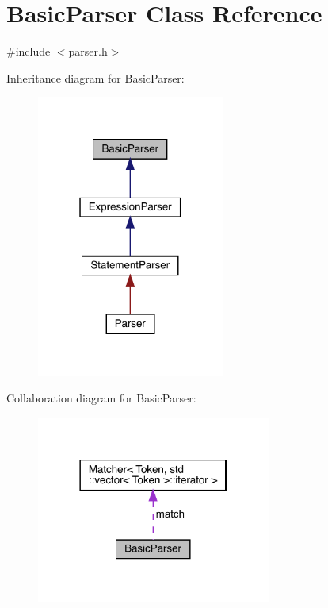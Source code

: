 \hypertarget{class_basic_parser}{}\section{Basic\+Parser Class Reference}
\label{class_basic_parser}


{\ttfamily \#include $<$parser.\+h$>$}



Inheritance diagram for Basic\+Parser\+:\nopagebreak
\begin{figure}[H]
\begin{center}
\leavevmode
\includegraphics[width=175pt]{class_basic_parser__inherit__graph}
\end{center}
\end{figure}


Collaboration diagram for Basic\+Parser\+:\nopagebreak
\begin{figure}[H]
\begin{center}
\leavevmode
\includegraphics[width=218pt]{class_basic_parser__coll__graph}
\end{center}
\end{figure}
